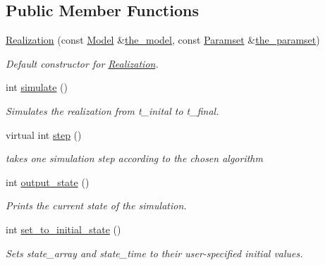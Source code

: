 \subsection*{Public Member Functions}
\begin{DoxyCompactItemize}
\item 
\hyperlink{class_realization_a599b405e69cc9dd43fc66b9b58a41ba8}{Realization} (const \hyperlink{class_model}{Model} \&\hyperlink{class_realization_aaf38f4ab6d7286c35942308bc78b38db}{the\+\_\+model}, const \hyperlink{class_paramset}{Paramset} \&\hyperlink{class_realization_a119bb29de88929bc51bc1b329473a94b}{the\+\_\+paramset})
\begin{DoxyCompactList}\small\item\em Default constructor for \hyperlink{class_realization}{Realization}. \end{DoxyCompactList}\item 
int \hyperlink{class_realization_aa8516a01a8e87ca4748ea2f43ebd6b60}{simulate} ()
\begin{DoxyCompactList}\small\item\em Simulates the realization from t\+\_\+inital to t\+\_\+final. \end{DoxyCompactList}\item 
\mbox{\label{class_realization_a74f7b9164e136edd4f2e446d267da56b}} 
virtual int \hyperlink{class_realization_a74f7b9164e136edd4f2e446d267da56b}{step} ()
\begin{DoxyCompactList}\small\item\em takes one simulation step according to the chosen algorithm \end{DoxyCompactList}\item 
int \hyperlink{class_realization_a0856e7aef37514c6ae1b685e6a436a38}{output\+\_\+state} ()
\begin{DoxyCompactList}\small\item\em Prints the current state of the simulation. \end{DoxyCompactList}\item 
int \hyperlink{class_realization_a24f8262338aa96a742ffc76f4128c2dd}{set\+\_\+to\+\_\+initial\+\_\+state} ()
\begin{DoxyCompactList}\small\item\em Sets state\+\_\+array and state\+\_\+time to their user-\/specified initial values. \end{DoxyCompactList}\end{DoxyCompactItemize}

